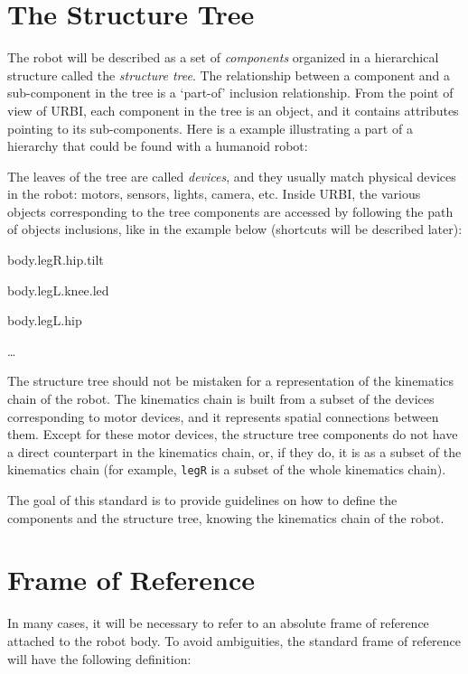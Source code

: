 \documentclass[a4paper]{article}
\begin{document}
\section[The Structure Tree]{The Structure
Tree}
{
\textsf{The robot will be described as a set of
}\textsf{\textit{components}}\textsf{ organized in a hierarchical
structure called the }\textsf{\textit{structure tree}}\textsf{. The
relationship between a component and a sub-component in the tree is a
‘part-of’ inclusion relationship. From the point of view of URBI, each
component in the tree is an object, and it contains attributes pointing
to its sub-components. Here is a example illustrating a part of a
hierarchy that could be found with a humanoid robot:}}



\begin{figure}
\centering
\end{figure}
{
\textsf{The leaves of the tree are called
}\textsf{\textit{devices}}\textsf{, and they usually match physical
devices in the robot: motors, sensors, lights, camera, etc. Inside
URBI, the various objects corresponding to the tree components are
accessed by following the path of objects inclusions, like in the
example below (shortcuts will be described later):}}

{
body.legR.hip.tilt}

{
body.legL.knee.led}

{
body.legL.hip}

{
…}

{\sffamily
The structure tree should not be mistaken for a representation of the
kinematics chain of the robot. The kinematics chain is built from a
subset of the devices corresponding to motor devices, and it represents
spatial connections between them. Except for these motor devices, the
structure tree components do not have a direct counterpart in the
kinematics chain, or, if they do, it is as a subset of the kinematics
chain (for example, \texttt{legR} is a subset of the whole kinematics
chain).}

{\sffamily
The goal of this standard is to provide guidelines on how to define the
components and the structure tree, knowing the kinematics chain of the
robot.}

\section[Frame of Reference]{Frame of
Reference}
{\sffamily
In many cases, it will be necessary to refer to an absolute frame of
reference attached to the robot body. To avoid ambiguities, the
standard frame of reference will have the following definition:}
\end{document}

